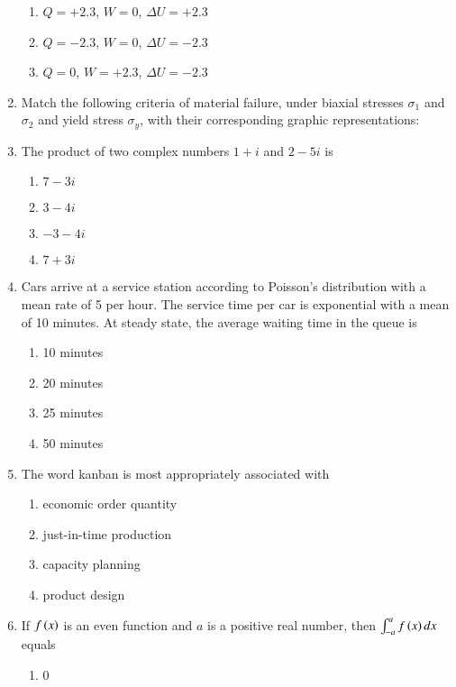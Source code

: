 \documentclass[journal]{IEEEtran}
\begin{document}
\begin{enumerate}
\begin{enumerate}
			\item $Q=+2.3$, $W=0$, $\Delta U = +2.3$
			\item $Q=-2.3$, $W=0$, $\Delta U = -2.3$
			\item $Q=0$, $W=+2.3$, $\Delta U = -2.3$
		\end{enumerate}
	\item
	Match the following criteria of material failure, under biaxial stresses $\sigma_{1}$ and $\sigma_{2}$ and yield stress $\sigma_{y}$, with their corresponding graphic representations:
	\begin{table}[H]    	
    		\centering
    		 
	\end{table}
	
	
	\item
	The product of two complex numbers $1+i$ and $2-5i$ is
		\begin{enumerate}
			\item $7-3i$
			\item $3-4i$
			\item $-3-4i$
			\item $7+3i$
		\end{enumerate}
	\item
	Cars arrive at a service station according to Poisson's distribution with a mean rate of 5 per hour. The service time per car is exponential with a mean of 10 minutes. At steady state, the average waiting time in the queue is
		\begin{enumerate}
			\item 10 minutes
			\item 20 minutes
			\item 25 minutes
			\item 50 minutes
		\end{enumerate}
	\item
	The word kanban is most appropriately associated with
		\begin{enumerate}
			\item economic order quantity
			\item just-in-time production
			\item capacity planning
			\item product design
		\end{enumerate}
	\item
	If $f\left(x\right)$ is an even function and $a$ is a positive real number, then $\int_{-a}^{a} f\left(x\right) dx$ equals
		\begin{enumerate}
			\item 0

\end{enumerate}
\end{enumerate}
\end{document}
